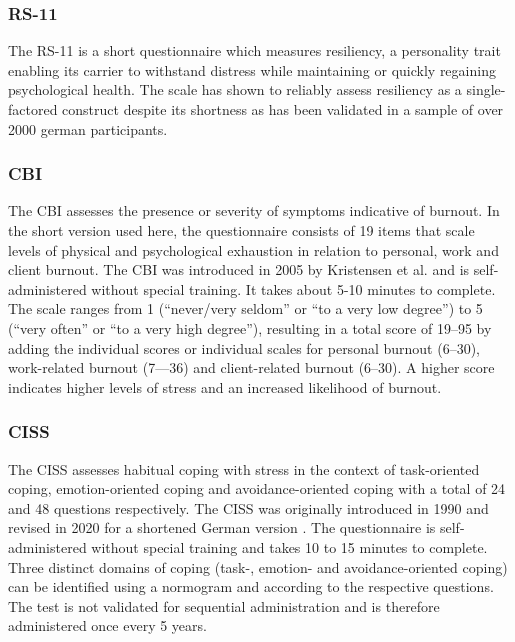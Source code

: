 \QPsychometrics{}

\subsubsection{\acf{RS-11}}
\label{questionnaires:BDI}
The \ac{RS-11} is a short questionnaire which measures resiliency, a personality trait enabling its carrier to withstand distress while maintaining or quickly regaining psychological health. The scale has shown to reliably assess resiliency as a single-factored construct despite its shortness as has been validated in a sample of over 2000 german participants. 

\QPsychometrics{}


\subsubsection{\acf{CBI}}
\label{questionnaires:CBI}
The \acl{CBI} assesses the presence or severity of symptoms indicative of burnout. In the short version used here, the questionnaire consists of 19 items that scale levels of physical and psychological exhaustion in relation to personal, work and client burnout. The CBI was introduced in 2005 by Kristensen et al. \cite{kristensen2005cbi} and is self-administered without special training. It takes about 5-10 minutes to complete. The scale ranges from 1 (``never/very seldom'' or ``to a very low degree'') to 5 (``very often'' or ``to a very high degree''), resulting in a total score of 19--95 by adding the individual scores or individual scales for personal burnout (6--30), work-related burnout (7---36) and client-related burnout (6--30). A higher score indicates higher levels of stress and an increased likelihood of burnout.

\QPsychometrics{}

\subsubsection{\acf{CISS}}
\label{questionnaires:CISS}
The \acl{CISS} assesses habitual coping with stress in the context of task-oriented coping, emotion-oriented coping and avoidance-oriented coping with a total of 24 and 48 questions respectively. The CISS was originally introduced in 1990 \cite{endler1990ciss} and revised in 2020 for a shortened German version \cite{kalin2020ciss}. The questionnaire is self-administered without special training and takes 10 to 15 minutes to complete. Three distinct domains of coping (task-, emotion- and avoidance-oriented coping) can be identified using a normogram and according to the respective questions. The test is not validated for sequential administration and is therefore administered once every 5 years.

